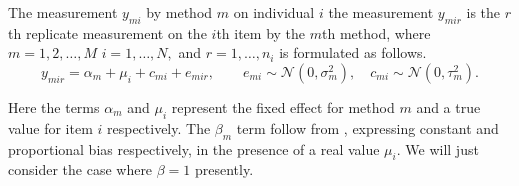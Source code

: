\documentclass[12pt, a4paper]{report}
\theoremstyle{plain}
\theoremstyle{definition}
\theoremstyle{remark}
\begin{document}
	
	
%
%	
%	
%	
%
%	
%	
%	
	
	
	The measurement $y_{mi}$ by method $m$ on individual $i$ the measurement $y_{mir} $ is the $r$th replicate measurement on the $i$th item by the $m$th method, where $m=1,2,\ldots,M$ $i=1,\ldots,N,$ and $r = 1,\ldots,n_i$ is formulated as follows.
%	
%	
	\begin{equation}
	y_{mir}  = \alpha_{m} + \mu_{i} + c_{mi} + e_{mir}, \qquad  e_{mi}
	\sim \mathcal{N}(0,\sigma^{2}_{m}), \quad c_{mi} \sim \mathcal{N}(0,\tau^{2}_{m}).
	\end{equation}

	Here the terms $\alpha_{m}$ and $\mu_{i}$ represent the fixed effect for method $m$ and a true value for item $i$ respectively. The $\beta_{m}$ term follow from \citet{DunnSEME}, expressing constant and proportional bias respectively, in the presence of a real value $\mu_{i}.$ We will just consider the case where $\beta=1$ presently. 
	
\end{document}
